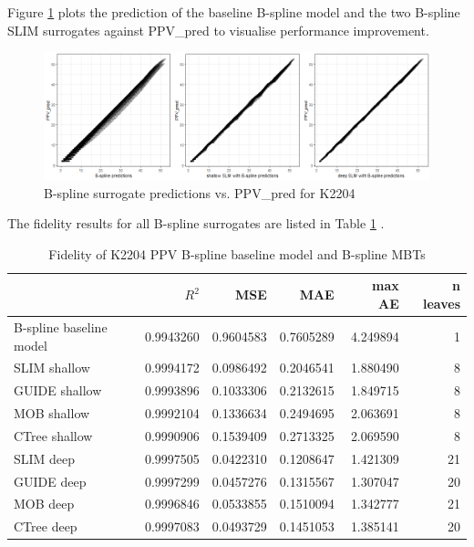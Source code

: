 Figure \ref{fig:ins_k2204_ppv_fit} plots the prediction of the baseline B-spline model and the two B-spline SLIM surrogates against PPV\_pred to visualise performance improvement. 

\begin{figure}[!htb]
    \centering    
    \includegraphics[width = 14cm]{Figures/insurance_use_case/k2204_PPV/fit.png}
    \caption{B-spline surrogate predictions vs. PPV\_pred for K2204}
    \label{fig:ins_k2204_ppv_fit}
\end{figure}

The fidelity results for all B-spline surrogates are listed in Table \ref{tab:ins_k2204_ppv_bsplines_surrogates_perf} .

\begin{table}

\centering \scriptsize
\begin{tabular}[t]{l|r|r|r|r|r}
\hline
  & $R^2$ & MSE & MAE & max AE & n leaves\\
\hline
B-spline baseline model & 0.9943260 & 0.9604583 & 0.7605289 & 4.249894 & 1\\
\hline
SLIM shallow & 0.9994172 & 0.0986492 & 0.2046541 & 1.880490 & 8\\
GUIDE shallow & 0.9993896 & 0.1033306 & 0.2132615 & 1.849715 & 8\\
MOB shallow & 0.9992104 & 0.1336634 & 0.2494695 & 2.063691 & 8\\
CTree shallow & 0.9990906 & 0.1539409 & 0.2713325 & 2.069590 & 8\\
\hline
SLIM deep & 0.9997505 & 0.0422310 & 0.1208647 & 1.421309 & 21\\
GUIDE deep & 0.9997299 & 0.0457276 & 0.1315567 & 1.307047 & 20\\
MOB deep & 0.9996846 & 0.0533855 & 0.1510094 & 1.342777 & 21\\
CTree deep & 0.9997083 & 0.0493729 & 0.1451053 & 1.385141 & 20\\
\hline
\end{tabular}
\label{tab:ins_k2204_ppv_bsplines_surrogates_perf}
\caption{Fidelity of K2204 PPV B-spline baseline model and  B-spline MBTs}
\end{table}





